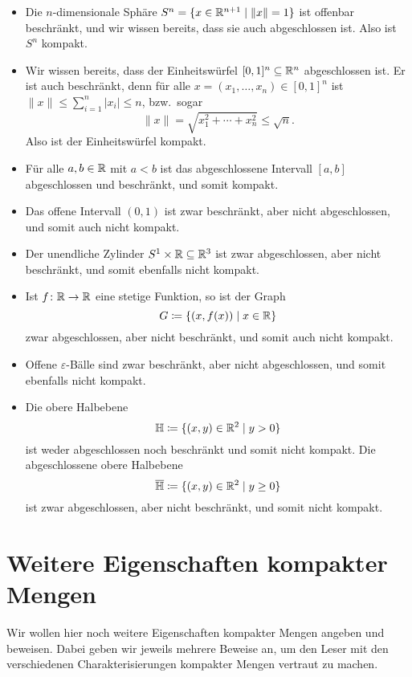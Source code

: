 \documentclass[a4paper,10pt]{article}
\begin{document}
\begin{bsp}
 \begin{itemize}
  \item
   Die $n$-dimensionale Sphäre $S^n = \{x \in \mathbb{R}^{n+1} \mid \|x\| = 1\}$ ist offenbar beschränkt, und wir wissen bereits, dass sie auch abgeschlossen ist. Also ist $S^n$ kompakt.
  \item
   Wir wissen bereits, dass der Einheitswürfel $[0,1]^n \subseteq \mathbb{R}^n$ abgeschlossen ist. Er ist auch beschränkt, denn für alle $x = (x_1, \dotsc, x_n) \in [0,1]^n$ ist $\|x\| \leq \sum_{i=1}^n |x_i| \leq n$, bzw.\ sogar
   \[
    \|x\|
    = \sqrt{x_1^2 + \dotsb + x_n^2}
    \leq \sqrt{n}.
   \]
   Also ist der Einheitswürfel kompakt.
  \item
   Für alle $a,b \in \mathbb{R}$ mit $a < b$ ist das abgeschlossene Intervall $[a,b]$ abgeschlossen und beschränkt, und somit kompakt.
  \item
   Das offene Intervall $(0,1)$ ist zwar beschränkt, aber nicht abgeschlossen, und somit auch nicht kompakt.
  \item
   Der unendliche Zylinder $S^1 \times \mathbb{R} \subseteq \mathbb{R}^3$ ist zwar abgeschlossen, aber nicht beschränkt, und somit ebenfalls nicht kompakt.
  \item
   Ist $f \colon \mathbb{R} \to \mathbb{R}$ eine stetige Funktion, so ist der Graph
   \[
    G \coloneqq \{(x,f(x)) \mid x \in \mathbb{R}\}
   \]
   zwar abgeschlossen, aber nicht beschränkt, und somit auch nicht kompakt.
  \item
   Offene $\varepsilon$-Bälle sind zwar beschränkt, aber nicht abgeschlossen, und somit ebenfalls nicht kompakt.
  \item
   Die obere Halbebene
   \[
    \mathbb{H} \coloneqq \{(x,y) \in \mathbb{R}^2 \mid y > 0\}
   \]
   ist weder abgeschlossen noch beschränkt und somit nicht kompakt. Die abgeschlossene obere Halbebene
   \[
    \overline{\mathbb{H}} \coloneqq \{(x,y) \in \mathbb{R}^2 \mid y \geq 0\}
   \]
   ist zwar abgeschlossen, aber nicht beschränkt, und somit nicht kompakt.
 \end{itemize}
\end{bsp}





\section{Weitere Eigenschaften kompakter Mengen}
Wir wollen hier noch weitere Eigenschaften kompakter Mengen angeben und beweisen. Dabei geben wir jeweils mehrere Beweise an, um den Leser mit den verschiedenen Charakterisierungen kompakter Mengen vertraut zu machen.
\end{document}
